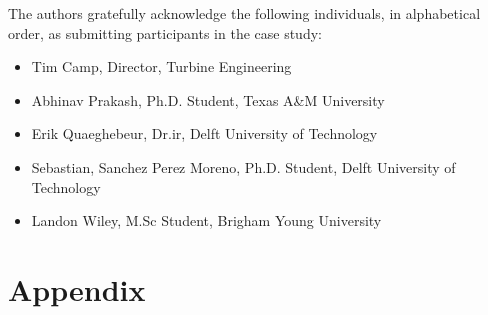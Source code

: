 \documentclass[conf,hidelinks]{new-aiaa} %
\begin{document}
The authors gratefully acknowledge the following individuals, in alphabetical order, as submitting participants in the case study:
\begin{itemize}
	\item Tim Camp, Director, Turbine Engineering
	\item Abhinav Prakash, Ph.D. Student, Texas A\&M University
	\item Erik Quaeghebeur, Dr.ir, Delft University of Technology
	\item Sebastian, Sanchez Perez Moreno, Ph.D. Student, Delft University of Technology
	\item Landon Wiley, M.Sc Student, Brigham Young University
\end{itemize}

\newpage
\section*{Appendix}

%

\FloatBarrier

\pagebreak
%

\end{document}
